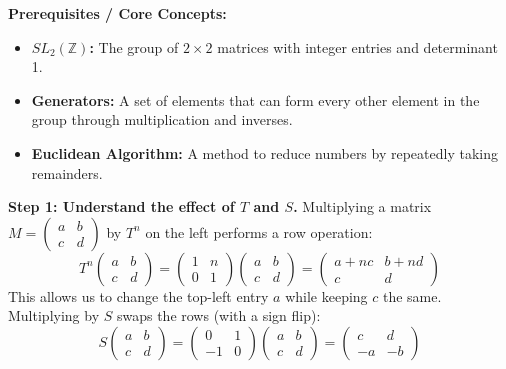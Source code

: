 \begin{solution}
\textbf{Prerequisites / Core Concepts:}
\begin{itemize}
    \item \textbf{$SL_2(\mathbb{Z})$:} The group of $2 \times 2$ matrices with integer entries and determinant 1.
    \item \textbf{Generators:} A set of elements that can form every other element in the group through multiplication and inverses.
    \item \textbf{Euclidean Algorithm:} A method to reduce numbers by repeatedly taking remainders.
\end{itemize}

\textbf{Step 1: Understand the effect of $T$ and $S$.}
Multiplying a matrix $M = \begin{pmatrix} a & b \\ c & d \end{pmatrix}$ by $T^n$ on the left performs a row operation:
\[ T^n \begin{pmatrix} a & b \\ c & d \end{pmatrix} = \begin{pmatrix} 1 & n \\ 0 & 1 \end{pmatrix} \begin{pmatrix} a & b \\ c & d \end{pmatrix} = \begin{pmatrix} a+nc & b+nd \\ c & d \end{pmatrix} \]
This allows us to change the top-left entry $a$ while keeping $c$ the same.
Multiplying by $S$ swaps the rows (with a sign flip):
\[ S \begin{pmatrix} a & b \\ c & d \end{pmatrix} = \begin{pmatrix} 0 & 1 \\ -1 & 0 \end{pmatrix} \begin{pmatrix} a & b \\ c & d \end{pmatrix} = \begin{pmatrix} c & d \\ -a & -b \end{pmatrix} \]


\end{solution}

